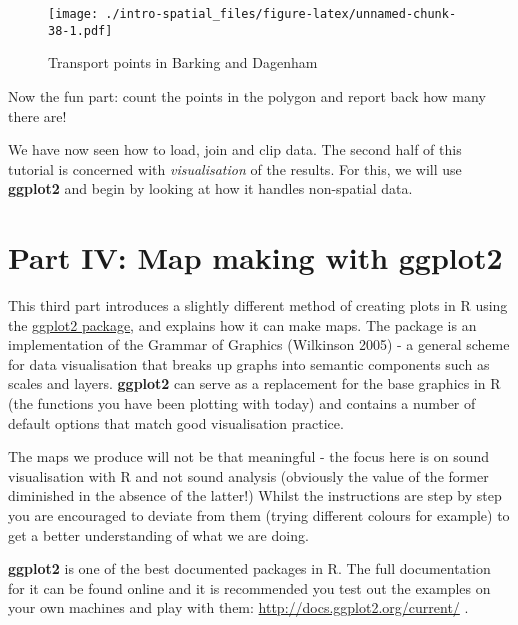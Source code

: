 \documentclass[]{article}
\newenvironment{Shaded}{}{}
\newcommand{\KeywordTok}[1]{\textcolor[rgb]{0.00,0.44,0.13}{\textbf{{#1}}}}
\newcommand{\StringTok}[1]{\textcolor[rgb]{0.25,0.44,0.63}{{#1}}}
\newcommand{\NormalTok}[1]{{#1}}
\begin{document}
\begin{Shaded}
\end{Shaded}

\begin{figure}[htbp]
\centering
\texttt{[image: ./intro-spatial\_files/figure-latex/unnamed-chunk-38-1.pdf]}
\caption{Transport points in Barking and Dagenham}
\end{figure}

Now the fun part: count the points in the polygon and report back how
many there are!

We have now seen how to load, join and clip data. The second half of
this tutorial is concerned with \emph{visualisation} of the results. For
this, we will use \textbf{ggplot2} and begin by looking at how it
handles non-spatial data.

\section{Part IV: Map making with
ggplot2}\label{part-iv-map-making-with-ggplot2}

This third part introduces a slightly different method of creating plots
in R using the \href{http://ggplot2.org/}{ggplot2 package}, and explains
how it can make maps. The package is an implementation of the Grammar of
Graphics (Wilkinson 2005) - a general scheme for data visualisation that
breaks up graphs into semantic components such as scales and layers.
\textbf{ggplot2} can serve as a replacement for the base graphics in R
(the functions you have been plotting with today) and contains a number
of default options that match good visualisation practice.

The maps we produce will not be that meaningful - the focus here is on
sound visualisation with R and not sound analysis (obviously the value
of the former diminished in the absence of the latter!) Whilst the
instructions are step by step you are encouraged to deviate from them
(trying different colours for example) to get a better understanding of
what we are doing.

\textbf{ggplot2} is one of the best documented packages in R. The full
documentation for it can be found online and it is recommended you test
out the examples on your own machines and play with them:
\url{http://docs.ggplot2.org/current/} .
\end{document}

